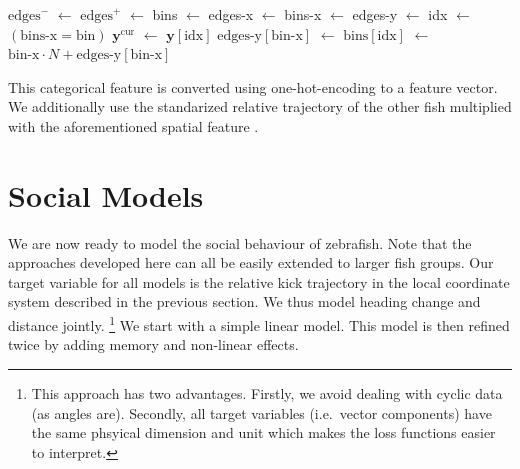 \documentclass[nobib, a4paper]{tufte-handout}
\newcommand*\Let[2]{\State #1 \(\gets\) #2}
\begin{document}
\MakeRobust{\Call} %
\begin{algorithm}[htb]
  \caption{%
\label{alg:binning}
    Data-driven Spatial Binning}

  \begin{algorithmic}
    \Let{$\text{edges}^-$}{}
    \Let{$\text{edges}^+$}{}
    \State \Return {}
\EndFunction 
{}
\Let{bins}{}
\Let{edges-x}{}
  \Let{bins-x}{}
  \Let{edges-y}{}
  \Let{idx}{$(\text{bins-x} = \text{bin})$}
  \Let{$\bm{y}^{\text{cur}}$}{$\bm{y} [\text{idx}]$}
  \Let{$\text{edges-y}[\text{bin-x}]$}{}
  \Let{$\text{bins}[\text{idx}]$}{$\text{bin-x} \cdot N + \text{edges-y}[\text{bin-x}]$}
\EndFor
{}
\end{algorithmic}
\end{algorithm}

This categorical feature is converted using one-hot-encoding to a feature vector.
We additionally use the standarized relative trajectory of the other fish multiplied with the aforementioned spatial feature%
.

\section{Social Models}\label{sec:social}
We are now ready to model the social behaviour of zebrafish.
Note that the approaches developed here can all be easily extended to larger fish groups.
Our target variable for all models is the relative kick trajectory in the local coordinate system described in the previous section.
We thus model heading change and distance jointly.%
\footnote{This approach has two advantages.
  Firstly, we avoid dealing with cyclic data (as angles are).
Secondly, all target variables (i.e.\ vector components) have the same phsyical dimension and unit which makes the loss functions easier to interpret.}
We start with a simple linear model.
This model is then refined twice by adding memory and non-linear effects.
\end{document}
